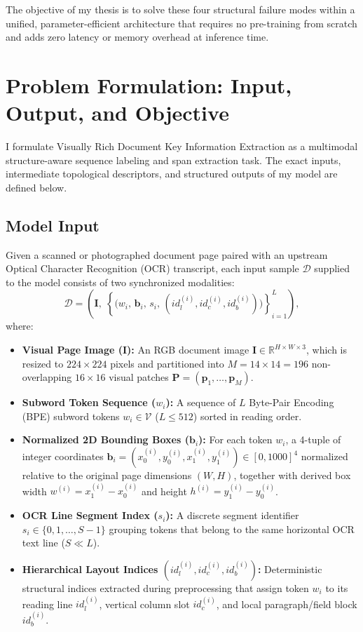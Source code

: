 The objective of my thesis is to solve these four structural failure modes within a unified, parameter-efficient architecture that requires no pre-training from scratch and adds zero latency or memory overhead at inference time.

\section{Problem Formulation: Input, Output, and Objective}
\label{sec:problem_statement}

I formulate Visually Rich Document Key Information Extraction as a multimodal structure-aware sequence labeling and span extraction task. The exact inputs, intermediate topological descriptors, and structured outputs of my model are defined below.

\subsection{Model Input}
Given a scanned or photographed document page paired with an upstream Optical Character Recognition (OCR) transcript, each input sample $\mathcal{D}$ supplied to the model consists of two synchronized modalities:
\begin{equation}
    \mathcal{D} = \left( \mathbf{I}, \; \left\{ \big(w_i, \, \mathbf{b}_i, \, s_i, \, (id_l^{(i)}, id_c^{(i)}, id_b^{(i)})\big) \right\}_{i=1}^{L} \right),
    \label{eq:doc_representation}
\end{equation}
where:
\begin{itemize}
    \item \textbf{Visual Page Image ($\mathbf{I}$):} An RGB document image $\mathbf{I} \in \mathbb{R}^{H \times W \times 3}$, which is resized to $224 \times 224$ pixels and partitioned into $M = 14 \times 14 = 196$ non-overlapping $16 \times 16$ visual patches $\mathbf{P} = (\mathbf{p}_1, \dots, \mathbf{p}_M)$.
    \item \textbf{Subword Token Sequence ($w_i$):} A sequence of $L$ Byte-Pair Encoding (BPE) subword tokens $w_i \in \mathcal{V}$ ($L \le 512$) sorted in reading order.
    \item \textbf{Normalized 2D Bounding Boxes ($\mathbf{b}_i$):} For each token $w_i$, a 4-tuple of integer coordinates $\mathbf{b}_i = (x_0^{(i)}, y_0^{(i)}, x_1^{(i)}, y_1^{(i)}) \in [0, 1000]^4$ normalized relative to the original page dimensions $(W, H)$, together with derived box width $w^{(i)} = x_1^{(i)} - x_0^{(i)}$ and height $h^{(i)} = y_1^{(i)} - y_0^{(i)}$.
    \item \textbf{OCR Line Segment Index ($s_i$):} A discrete segment identifier $s_i \in \{0, 1, \dots, S-1\}$ grouping tokens that belong to the same horizontal OCR text line ($S \ll L$).
    \item \textbf{Hierarchical Layout Indices $(id_l^{(i)}, id_c^{(i)}, id_b^{(i)})$:} Deterministic structural indices extracted during preprocessing that assign token $w_i$ to its reading line $id_l^{(i)}$, vertical column slot $id_c^{(i)}$, and local paragraph/field block $id_b^{(i)}$.
\end{itemize}

